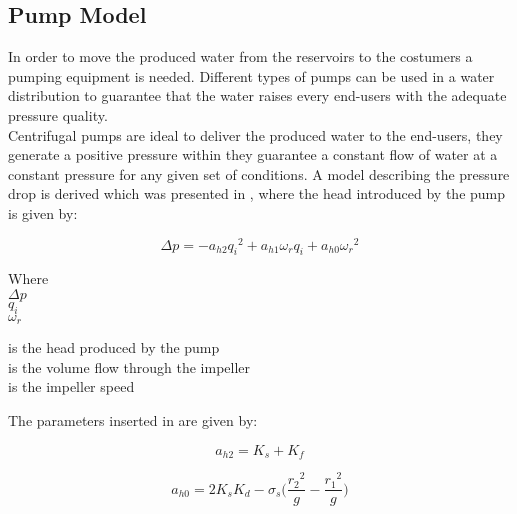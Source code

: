 \subsection{Pump Model} 
\label{PumpModel}
In order to move the produced water from the reservoirs to the costumers a 
pumping equipment is needed.  Different types of pumps can be used in a water distribution to 
guarantee that the water raises every end-users with the adequate pressure 
quality.\\
Centrifugal pumps are ideal to deliver the produced water to the end-users, they 
generate a positive pressure within they guarantee a constant flow of water at a 
constant pressure for any given set of conditions. 
A model describing the pressure drop is derived which was presented in 
\cite{Phd_Carsten}, where the head introduced by the pump is given by:

\begin{equation}
  \Delta p = -a_{h2}{q_i}^2 + a_{h1} \omega_r q_i + a_{h0}{\omega_r}^2
  \label{PumpModel}
\end{equation}

\begin{minipage}[t]{0.20\textwidth}
Where\\
\hspace*{8mm} $\Delta p$ \\
\hspace*{8mm} $q_i$ \\
\hspace*{8mm} $\omega_r$ 

\end{minipage}
\begin{minipage}[t]{0.68\textwidth}
\vspace*{2mm}
is the head produced by the pump\\
is the volume flow through the impeller\\
is the impeller speed
\end{minipage}

The parameters inserted in  are given by:

\begin{minipage}[t]{0.20\textwidth}
\begin{equation*}
  a_{h2} = K_s + K_f
\end{equation*}
\end{minipage}
\begin{minipage}[t]{0.68\textwidth}
\begin{equation*}
  a_{h0} = 2K_sK_d - \sigma_s 
  \bigg(\frac{{r_2}^2}{g}-\frac{{r_1}^2}{g}\bigg)
\end{equation*}
\end{minipage}

